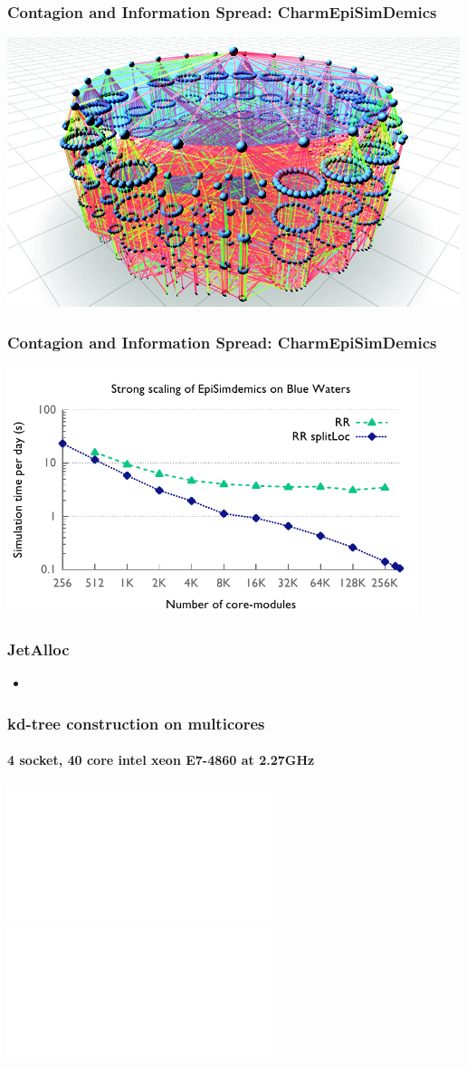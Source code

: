 \begin{frame}
\frametitle{Contagion and Information Spread: CharmEpiSimDemics}
\includegraphics[width=\textwidth]{../figures/contagion.png}
\end{frame}


\begin{frame}
\frametitle{Contagion and Information Spread: CharmEpiSimDemics}
\begin{center}
\includegraphics[width=0.9\textwidth]{../figures/simdemics_strong_scaling.pdf}
\end{center}
\end{frame}


\begin{frame}
\frametitle{JetAlloc}
%
\begin{itemize}
\item
\end{itemize}
%
\end{frame}

\begin{frame}
\frametitle{kd-tree construction on multicores}
\framesubtitle{4 socket, 40 core intel xeon E7-4860 at 2.27GHz}
\includegraphics<1>[width=\textwidth]{../figures/kdtree/speedup_8.pdf}
\includegraphics<2>[width=\textwidth]{../figures/kdtree/speedup_15.pdf}
\end{frame}


